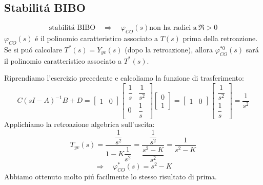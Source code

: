 \documentclass[../main.tex]{subfiles}
\begin{document}
	\subsection{Stabilit\'a BIBO}
		\[
			\text{stabilit\'a BIBO}\quad\Rightarrow\quad \varphi_{CO}(s) \text{non ha radici a}\ \Re > 0
		\]
		$ \varphi_{CO}(s) $ \'e il polinomio caratteristico associato a $ T(s) $ prima della retroazione. Se si pu\'o calcolare $ T^{*}(s) = Y_{yv}(s) $ (dopo la retroazione), allora $ \varphi^{*0}_{CO}(s) $ sar\'a il polinomio caratteristico associato a $ T^{*}(s) $.
		\begin{Exercise}[title={Studiare retroazione algebrica uscita attraverso l'algebra dei blocchi}]
			Riprendiamo l'esercizio precedente e calcoliamo la funzione di trasferimento:
			\[
				C(sI-A)^{-1}B +D =
				\begin{bmatrix}
					1 & 0
				\end{bmatrix}
				\begin{bmatrix}
					\dfrac{1}{s} & \dfrac{1}{s^2}\\
					0 & \dfrac{1}{s}
				\end{bmatrix}
				\begin{bmatrix}
					0\\
					1
				\end{bmatrix} =
				\begin{bmatrix}
					1 & 0
				\end{bmatrix}
				\begin{bmatrix}
					\dfrac{1}{s^2}\\
					\dfrac{1}{s}
				\end{bmatrix} =
				\dfrac{1}{s^2}
			\]
			Applichiamo la retroazione algebrica sull'uscita:
			\[
				T_{yv}(s) = \dfrac{\dfrac{1}{s^2}}{1-K\dfrac{1}{s^2}} = \dfrac{\dfrac{1}{s^2}}{\dfrac{s^2-K}{s^2}} = \dfrac{1}{s^2 - K}
			\]
			\[
				\Rightarrow\quad \varphi^{*}_{CO}(s) = s^2 -K
			\]
			Abbiamo ottenuto molto pi\'u facilmente lo stesso risultato di prima.
		\end{Exercise}
\end{document}
